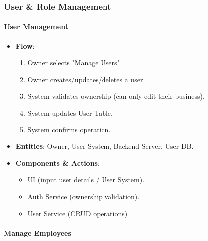 \documentclass[]{VUMIFTemplateClass}
\begin{document}
\subsubsection{User \& Role Management}

\paragraph{User Management}
\begin{itemize}
    \item \textbf{Flow}: \begin{enumerate}
    \item Owner selects "Manage Users"
    \item Owner creates/updates/deletes a user.
    \item System validates ownership (can only edit their business).
    \item System updates User Table.
    \item System confirms operation.
    \end{enumerate}
    \item \textbf{Entities}: Owner, User System, Backend Server, User DB.
    \item \textbf{Components \& Actions}: \begin{itemize}
        \item UI (input user details / User System).
        \item Auth Service (ownership validation).
        \item User Service (CRUD operations)
    \end{itemize}
\end{itemize}

\paragraph{Manage Employees}
\end{document}
